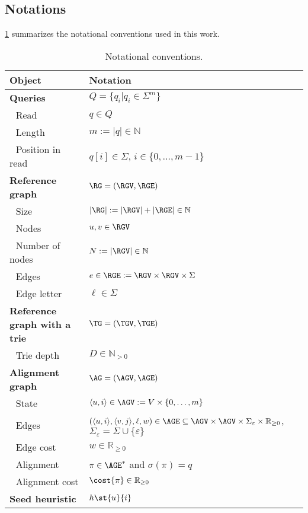 \subsection{Notations} \label{sec:notation}

\cref{tab:notation} summarizes the notational conventions used in this work.

\begin{table}[!h]
	\centering
	\caption{Notational conventions.}\label{tab:notation}
	\begin{tabular}{ll}
	\hline
	\textbf{Object}	         & \textbf{Notation}\\
	\hline
	\textbf{Queries}  & $Q = \{ q_i \vert q_i \in \Sigma^m \}$ \\
	\,\, Read            & $q \in Q$ \\
	\,\, Length     & $m := \lvert q \rvert\in \mathbb{N}$\\
	\,\, Position in read & $q[i] \in \Sigma$, $i \in \{0,\dots,m-1\}$\\	
	\hline
	\textbf{Reference graph}& $\RG=(\RGV,\RGE)$\\
	\,\, Size& $\lvert \RG \rvert := \lvert \RGV \rvert + \lvert \RGE \rvert \in \mathbb{N}$\\
	\,\, Nodes& $u, v \in \RGV$\\
	\,\, Number of nodes& $N := \lvert \RGV \rvert \in \mathbb{N}$\\
	\,\, Edges& $e \in \RGE := \RGV \times \RGV \times \Sigma$\\
	\,\, Edge letter& $\ell \in \Sigma$\\
	\textbf{Reference graph with a trie} & $\TG = (\TGV, \TGE)$ \\
	\,\, Trie depth  & $D \in \mathbb{N}_{>0}$\\
	\hline
	\textbf{Alignment graph}& $\AG=(\AGV,\AGE)$\\
	\,\, State& $\langle u,i \rangle \in \AGV := V \times \{0,\dots,m\}$\\
	\,\, Edges& $(\langle u,i \rangle, \langle v,j \rangle,\ell,w) \in \AGE
	\subseteq \AGV \times \AGV \times \Sigma_{\varepsilon} \times
	\mathbb{R}_{\geq 0}$, $\Sigma_{\varepsilon} = \Sigma \cup \{\varepsilon\}$\\
	\,\, Edge cost& $w \in \mathbb{R}_{\geq 0}$\\
	\,\, Alignment& $\pi \in \AGE^*$ and $\sigma(\pi)=q$ \\
	\,\, Alignment cost& $\cost{\pi} \in \mathbb{R}_{\geq 0}$\\
	\hline
	\textbf{Seed heuristic}& $h\st{u}{i}$\\

\end{tabular}
\end{table}
